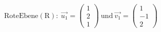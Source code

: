 \documentclass[preview]{standalone}
\begin{document}
\begin{center}
$\mathrm{Rote Ebene (R):} \: \vec{u_1} = \begin{pmatrix} 1 \\ 2 \\ 1 \end{pmatrix} \: \mathrm{und} \: \vec{v_1} = \begin{pmatrix} 1 \\ -1 \\ 2 \end{pmatrix}$
\end{center}
\end{document}
